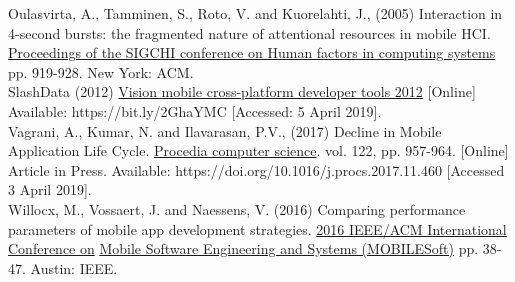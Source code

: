 \documentclass[version=last,fontsize=13pt]{scrartcl}
\begin{document}
Oulasvirta, A., Tamminen, S., Roto, V. and Kuorelahti, J., (2005) Interaction in 4-second bursts: the fragmented nature of attentional resources in mobile HCI. \\
\underline{ Proceedings of the SIGCHI conference on Human factors in computing systems} pp. 919-928. New York: ACM. \\

SlashData (2012) \underline{Vision mobile cross-platform developer tools 2012}  [Online] Available: https://bit.ly/2GhaYMC [Accessed: 5 April 2019].\\

Vagrani, A., Kumar, N. and Ilavarasan, P.V., (2017) Decline in Mobile Application Life Cycle. \underline{Procedia computer science}. vol. 122, pp. 957-964. [Online] Article in Press. Available: https://doi.org/10.1016/j.procs.2017.11.460 [Accessed 3 April 2019].\\

Willocx, M., Vossaert, J. and Naessens, V. (2016) Comparing performance parameters of mobile app development strategies.  \underline{2016 IEEE/ACM International Conference on} \underline{Mobile Software Engineering and Systems (MOBILESoft)} pp. 38-47.  Austin: IEEE.\\
\end{document}
